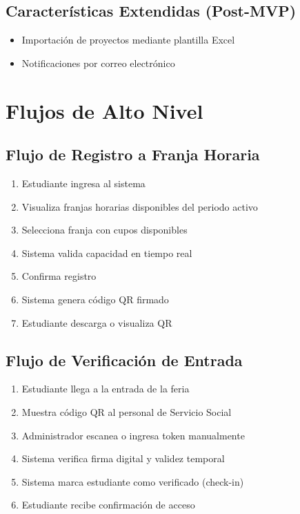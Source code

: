 \documentclass[12pt,a4paper]{article}
\begin{document}
\subsection{Características Extendidas (Post-MVP)}

\begin{itemize}[leftmargin=*]
    \item Importación de proyectos mediante plantilla Excel
    \item Notificaciones por correo electrónico
\end{itemize}

\section{Flujos de Alto Nivel}

\subsection{Flujo de Registro a Franja Horaria}

\begin{enumerate}
    \item Estudiante ingresa al sistema
    \item Visualiza franjas horarias disponibles del periodo activo
    \item Selecciona franja con cupos disponibles
    \item Sistema valida capacidad en tiempo real
    \item Confirma registro
    \item Sistema genera código QR firmado
    \item Estudiante descarga o visualiza QR
\end{enumerate}

\subsection{Flujo de Verificación de Entrada}

\begin{enumerate}
    \item Estudiante llega a la entrada de la feria
    \item Muestra código QR al personal de Servicio Social
    \item Administrador escanea o ingresa token manualmente
    \item Sistema verifica firma digital y validez temporal
    \item Sistema marca estudiante como verificado (check-in)
    \item Estudiante recibe confirmación de acceso
\end{enumerate}
\end{document}
